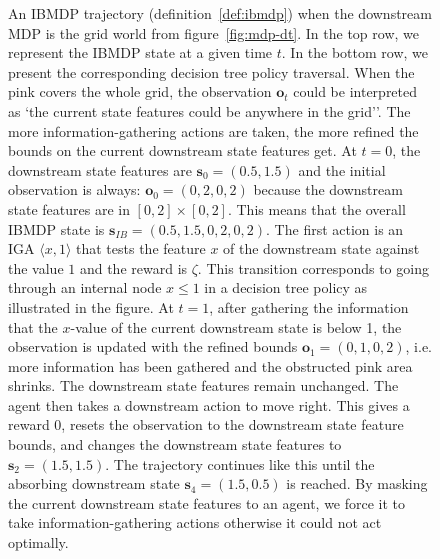\begin{figure}[h!]
{}
\caption{An IBMDP trajectory (definition~\ref{def:ibmdp}) when the downstream MDP is the grid world from figure~\ref{fig:mdp-dt}.
In the top row, we represent the IBMDP state at a given time $t$. In the bottom row, we present the corresponding decision tree policy traversal.
When the pink covers the whole grid, the observation $\boldsymbol{o}_t$ could be interpreted as `the current state features could be anywhere in the grid''.
The more information-gathering actions are taken, the more refined the bounds on the current downstream state features get.
At $t=0$, the downstream state features are $\boldsymbol{s}_0 = (0.5, 1.5)$ and the initial observation is always: $\boldsymbol{o}_0=(0, 2, 0, 2)$ because the downstream state features are in $[0, 2] \times [0, 2]$.
This means that the overall IBMDP state is $\boldsymbol{s}_{IB} = (0.5, 1.5, 0, 2, 0, 2)$. The first action is an IGA $\langle x, 1\rangle$ that tests the feature $x$ of the downstream state against the value $1$ and the reward is $\zeta$.
This transition corresponds to going through an internal node $ x\leq 1$ in a decision tree policy as illustrated in the figure.
At $t=1$, after gathering the information that the $x$-value of the current downstream state is below 1, the observation is updated with the refined bounds $\boldsymbol{o}_1=(0, 1, 0, 2)$, i.e. more information has been gathered and the obstructed pink area shrinks. The downstream state features remain unchanged. The agent then takes a downstream action to move right.
This gives a reward 0, resets the observation to the downstream state feature bounds, and changes the downstream state features to $\boldsymbol{s}_2=(1.5, 1.5)$. The trajectory continues like this until the absorbing downstream state $\boldsymbol{s}_4=(1.5, 0.5)$ is reached.
By masking the current downstream state features to an agent, we force it to take information-gathering actions otherwise it could not act optimally.}\label{fig:ibmdp-example}
\end{figure}


